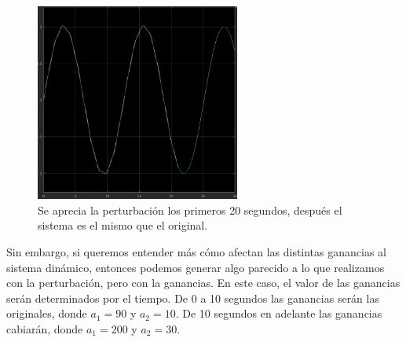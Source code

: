 \documentclass[12pt, letterpaper]{article}
\begin{document}
\begin{figure}[H]
	\centering
	\includegraphics[width=0.6\textwidth]{sgain.png}
	\caption{Se aprecia la perturbación los primeros 20 segundos, después el sistema es el mismo que el original.}
\end{figure}

Sin embargo, si queremos entender más cómo afectan las distintas ganancias al sistema dinámico, entonces podemos generar algo parecido a lo que realizamos con la perturbación, pero con la ganancias. En este caso, el valor de las ganancias serán determinados por el tiempo. De 0 a 10 segundos las ganancias serán las originales, donde $a_1 = 90$ y $a_2 = 10$. De 10 segundos en adelante las ganancias cabiarán, donde $a_1 = 200$ y $a_2 = 30$.
\end{document}
